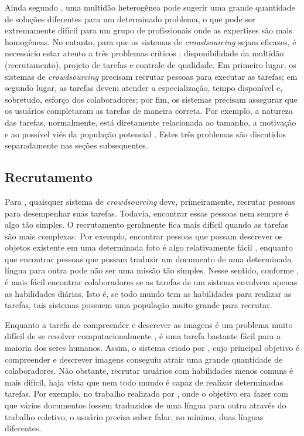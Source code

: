Ainda segundo \cite{surowiecki2005}, uma multidão heterogênea pode sugerir uma grande quantidade de soluções diferentes para um determinado problema, o que pode ser extremamente difícil para um grupo de profissionais onde as expertises são mais homogêneas. No entanto, para que os sistemas de \textit{crowdsourcing} sejam eficazes, é necessário estar atento a três problemas críticos \citep{Hu2012}:  disponibilidade da multidão (recrutamento), projeto de tarefas e controle de qualidade. Em primeiro lugar, os sistemas de \textit{crowdsourcing} precisam recrutar pessoas para executar as tarefas; em segundo lugar, as tarefas devem atender a especialização, tempo disponível e, sobretudo, esforço dos colaboradores; por fim, os sistemas precisam assegurar que os usuários completaram as tarefas de maneira correta. Por exemplo, a natureza das tarefas, normalmente, está diretamente relacionada ao tamanho, a motivação e ao possível viés da população potencial \citep{Hu2012}. Estes três problemas são discutidos separadamente nas seções subsequentes.

\subsection{Recrutamento}
Para \cite{Hu2012}, quaisquer sistema de \textit{crowdsourcing} deve, primeiramente, recrutar pessoas para desempenhar suas tarefas. Todavia, encontrar essas pessoas nem sempre é algo tão simples. O recrutamento geralmente fica mais difícil quando as tarefas são mais complexas. Por exemplo, encontrar pessoas que possam descrever os objetos existente em uma determinada foto é algo relativamente fácil \citep{Von2004}, enquanto que encontrar pessoas que possam traduzir um documento de uma determinada língua para outra \citep{Zaidan2011} pode não ser uma missão tão simples. Nesse sentido, conforme \cite{Hu2012}, é mais fácil encontrar colaboradores se as tarefas de um sistema envolvem apenas as habilidades diárias. Isto é, se todo mundo tem as habilidades para realizar as tarefas, tais sistemas possuem uma população muito grande para recrutar. 

Enquanto a tarefa de compreender e descrever as imagens é um problema muito difícil de se resolver computacionalmente  \citep{Von2004}, é uma tarefa bastante fácil para a maioria dos seres humanos. Assim, o sistema criado por  \cite{Von2004}, cujo principal objetivo é compreender e descrever imagens conseguiu atrair uma grande quantidade de colaboradores. Não obstante, recrutar usuários com habilidades menos comuns é mais difícil, haja vista que nem todo mundo é capaz de realizar determinadas tarefas. Por exemplo, no trabalho realizado por \cite{Zaidan2011} , onde o objetivo era fazer com que vários documentos fossem traduzidos de uma língua para outra através do trabalho coletivo, o usuário precisa saber  falar, no mínimo, duas línguas diferentes.

